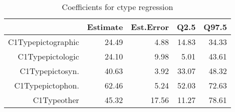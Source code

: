 \begin{table}[ht]
\centering
\begin{tabular}{rrrrr}
  \hline
 & Estimate & Est.Error & Q2.5 & Q97.5 \\ 
  \hline
C1Typepictographic & 24.49 & 4.88 & 14.83 & 34.33 \\ 
  C1Typepictologic & 24.10 & 9.98 & 5.01 & 43.61 \\ 
  C1Typepictosyn. & 40.63 & 3.92 & 33.07 & 48.32 \\ 
  C1Typepictophon. & 62.46 & 5.24 & 52.03 & 72.63 \\ 
  C1Typeother & 45.32 & 17.56 & 11.27 & 78.61 \\ 
   \hline
\end{tabular}
\caption{Coefficients for ctype regression} 
\end{table}
